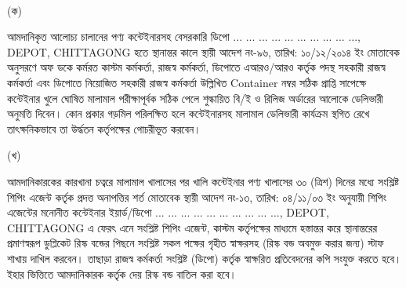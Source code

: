 \documentclass[12pt]{article}
\newcommand{\depo}{... ... ... ... ... ... ... ... ... ..., DEPOT, CHITTAGONG}
\newcommand{\rdepo}{... ... ... ... ... ... ... ... ... ..., DEPOT, CHITTAGONG}
\begin{document}
\\
\begin{minipage}[t]{0.04\linewidth}
\hspace{0.5em}
\end{minipage}
\begin{minipage}[t]{0.04\linewidth}
\scriptsize{(ক)}
\end{minipage}
\begin{minipage}[t]{.92\linewidth}
\scriptsize{আমদানিকৃত আলোচ্য চালানের পণ্য
কন্টেইনারসহ বেসরকারি ডিপো
{\depo}
হতে স্থানান্তর কালে স্থায়ী
আদেশ নং-৯৬, তারিখ: ১০/১২/২০১৪ ইং
মোতাবেক অনুসরণে অফ ডকে
কর্মরত কাস্টম কর্মকর্তা, রাজস্ব কর্মকর্তা,
ডিপোতে এআরও/আরও কর্তৃক পদস্থ সহকারী রাজস্ব
কর্মকর্তা এবং ডিপোতে নিয়োজিত সহকারী
রাজস্ব কর্মকর্তা উল্লিখিত Container
নম্বর সঠিক প্রাপ্তি সাপেক্ষে কন্টেইনার খুলে
ঘোষিত মালামাল পরীক্ষাপূর্বক সঠিক পেলে শুল্কায়িত
বি/ই ও রিলিজ অর্ডারের আলোকে ডেলিভারী অনুমতি
দিবেন। কোন প্রকার গড়মিল পরিলক্ষিত হলে
কন্টেইনারসহ মালামাল ডেলিভারী কার্যক্রম স্থগিত রেখে
তাৎক্ষনিকভাবে তা উর্দ্ধতন কর্তৃপক্ষের গোচরীভূত করবেন।}
\\
\end{minipage}
\begin{minipage}[t]{0.04\linewidth}
\hspace{0.5em}
\end{minipage}
\begin{minipage}[t]{0.04\linewidth}
\scriptsize{(খ)}
\end{minipage}
\begin{minipage}[t]{0.92\linewidth}
\scriptsize{আমদানিকারকের কারখানা চত্বরে
মালামাল খালাসের পর খালি কন্টেইনার পণ্য খালাসের
৩০ (ত্রিশ) দিনের মধ্যে সংশ্লিষ্ট শিপিং এজেন্ট কর্তৃক
প্রদত্ত অনাপত্তির শর্ত মোতাবেক স্থায়ী
আদেশ নং-১৩, তারিখ: ০৪/১১/০৩ ইং
অনুযায়ী শিপিং এজেন্টের মনোনীত কন্টেইনার
ইয়ার্ড/ডিপো {\rdepo} এ ফেরৎ এনে সংশ্লিষ্ট
শিপিং এজেন্ট, কাস্টম কর্তৃপক্ষের মাধ্যমে হস্তান্তর করে
স্থানান্তরের প্রমাণস্বরূপ ডুপ্লিকেট রিস্ক বন্ডের পিছনে
সংশ্লিষ্ট সকল পক্ষের গৃহীত স্বাক্ষরসহ
(রিস্ক বন্ড অবমুক্ত করার জন্য)
স্টাফ শাখায় দাখিল করবেন।
তাছাড়া রাজস্ব কর্মকর্তা সংশ্লিষ্ট (ডিপো) কর্তৃক
স্বাক্ষরিত প্রতিবেদনের কপি সংযুক্ত করতে হবে।
ইহার ভিত্তিতে আমদানিকারক কর্তৃক দেয়
রিস্ক বন্ড বাতিল করা হবে।}
\\
\\
\\
\\
\\
\\
\end{minipage}
\begin{minipage}[t]{0.60\linewidth}
\hspace{1em}
\end{minipage}
\end{document}
